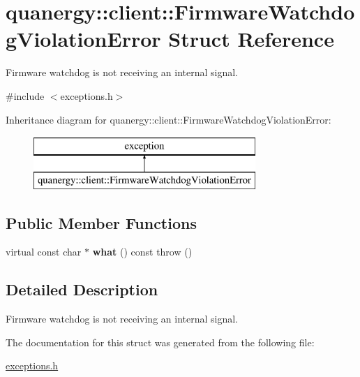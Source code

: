 \hypertarget{structquanergy_1_1client_1_1FirmwareWatchdogViolationError}{\section{quanergy\-:\-:client\-:\-:Firmware\-Watchdog\-Violation\-Error Struct Reference}
\label{structquanergy_1_1client_1_1FirmwareWatchdogViolationError}
}


Firmware watchdog is not receiving an internal signal.  




{\ttfamily \#include $<$exceptions.\-h$>$}

Inheritance diagram for quanergy\-:\-:client\-:\-:Firmware\-Watchdog\-Violation\-Error\-:\begin{figure}[H]
\begin{center}
\leavevmode
\includegraphics[height=2.000000cm]{structquanergy_1_1client_1_1FirmwareWatchdogViolationError}
\end{center}
\end{figure}
\subsection*{Public Member Functions}
\begin{DoxyCompactItemize}
\item 
\hypertarget{structquanergy_1_1client_1_1FirmwareWatchdogViolationError_a840c24c7804eddc85bbe033247b2a447}{virtual const char $\ast$ {\bfseries what} () const   throw ()}\label{structquanergy_1_1client_1_1FirmwareWatchdogViolationError_a840c24c7804eddc85bbe033247b2a447}

\end{DoxyCompactItemize}


\subsection{Detailed Description}
Firmware watchdog is not receiving an internal signal. 

The documentation for this struct was generated from the following file\-:\begin{DoxyCompactItemize}
\item 
\hyperlink{exceptions_8h}{exceptions.\-h}\end{DoxyCompactItemize}
